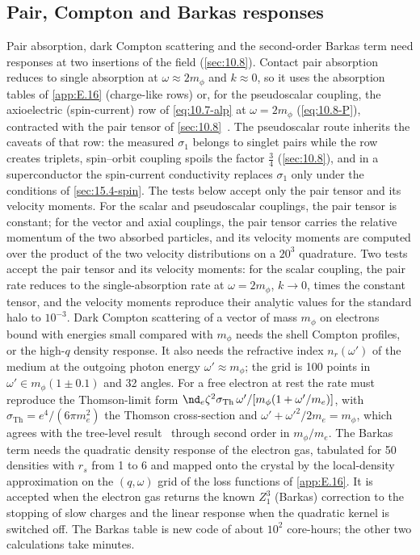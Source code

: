 \subsection{Pair, Compton and Barkas responses}

Pair absorption, dark Compton scattering and the second-order Barkas term need responses at two insertions of the field (\cref{sec:10.8}). Contact pair absorption reduces to single absorption at $\omega \approx 2m_\phi$ and $k \approx 0$, so it uses the absorption tables of \cref{app:E.16} (charge-like rows) or, for the pseudoscalar coupling, the axioelectric (spin-current) row of \cref{eq:10.7-alp} at $\omega = 2m_\phi$ (\cref{eq:10.8-P}), contracted with the pair tensor of \cref{sec:10.8}~\cite[Eqs.~(5)--(8)]{bauer2026dark}. The pseudoscalar route inherits the caveats of that row: the measured $\sigma_1$ belongs to singlet pairs while the row creates triplets, spin--orbit coupling spoils the factor $\frac34$ (\cref{sec:10.8}), and in a superconductor the spin-current conductivity replaces $\sigma_1$ only under the conditions of \cref{sec:15.4-spin}. The tests below accept only the pair tensor and its velocity moments. For the scalar and pseudoscalar couplings, the pair tensor is constant; for the vector and axial couplings, the pair tensor carries the relative momentum of the two absorbed particles, and its velocity moments are computed over the product of the two velocity distributions on a $20^3$ quadrature. Two tests accept the pair tensor and its velocity moments: for the scalar coupling, the pair rate reduces to the single-absorption rate at $\omega = 2m_\phi$, $k \to 0$, times the constant tensor, and the velocity moments reproduce their analytic values for the standard halo to $10^{-3}$. Dark Compton scattering of a vector of mass $m_\phi$ on electrons bound with energies small compared with $m_\phi$ needs the shell Compton profiles, or the high-$q$ density response. It also needs the refractive index $n_r(\omega')$ of the medium at the outgoing photon energy $\omega' \approx m_\phi$; the grid is 100 points in $\omega' \in m_\phi(1 \pm 0.1)$ and 32 angles. For a free electron at rest the rate must reproduce the Thomson-limit form $\nd_e\zeta^2\sigma_{\mathrm{Th}}\,\omega'/[m_\phi(1 + \omega'/m_e)]$, with $\sigma_{\mathrm{Th}} = e^4/(6\pi m_e^2)$ the Thomson cross-section and $\omega' + \omega'^2/2m_e = m_\phi$, which agrees with the tree-level result~\cite[Eq.~(2)]{hochberg2022impact} through second order in $m_\phi/m_e$. The Barkas term needs the quadratic density response of the electron gas, tabulated for 50 densities with $r_s$ from 1 to 6 and mapped onto the crystal by the local-density approximation on the $(q,\omega)$ grid of the loss functions of \cref{app:E.16}. It is accepted when the electron gas returns the known $Z_1^3$ (Barkas) correction to the stopping of slow charges and the linear response when the quadratic kernel is switched off. The Barkas table is new code of about $10^2$ core-hours; the other two calculations take minutes.
